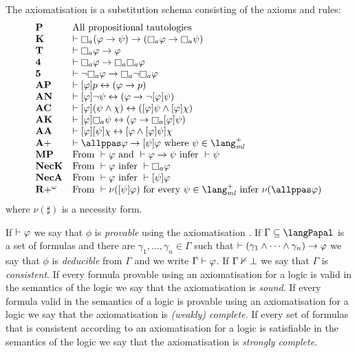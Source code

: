 \begin{definition}
The axiomatisation \axiomPapalS{} is a substitution schema consisting of the axioms and rules:
$$
\begin{array}{ll}
    {\bf P} & \text{All propositional tautologies}\\
    {\bf K} & \proves \knowsA (\phi \implies \psi) \implies (\knowsA \phi \implies \knowsA \psi)\\
    {\bf T} & \proves \knowsA \phi \implies \phi\\
    {\bf 4} & \proves \knowsA \phi \implies \knowsA \knowsA \phi\\
    {\bf 5} & \proves \neg \knowsA \phi \implies \knowsA \neg \knowsA \phi\\
    {\bf AP} & \proves \announceA{\phi} \atomP \iff (\phi \implies \atomP)\\
    {\bf AN} & \proves \announceA{\phi} \neg \psi \iff (\phi \implies \neg \announceA{\phi} \psi)\\
    {\bf AC} & \proves \announceA{\phi} (\psi \land \chi) \iff (\announceA{\phi} \psi \land \announceA{\phi} \chi)\\
    {\bf AK} & \proves \announceA{\phi} \knowsA \psi \iff (\phi \implies \knowsA \announceA{\phi} \psi)\\
    {\bf AA} & \proves \announceA{\phi} \announceA{\psi} \chi \iff \announceA{\phi \land \announceA{\phi} \psi} \chi\\
    {\bf A+} & \proves \allppas \phi \implies \announceA{\psi} \phi \text{ where } \psi \in \langMlPlus\\
    {\bf MP} & \text{From } \proves \phi \text{ and } \proves \phi \implies \psi \text{ infer } \proves \psi\\
    {\bf NecK} & \text{From } \proves \phi \text{ infer } \proves \knowsA \phi\\
    {\bf NecA} & \text{From } \proves \phi \text{ infer } \proves \announceA{\psi} \phi\\
    {\bf R+^\omega} &\text{From } \proves \nu(\announceA{\psi} \phi) \text{ for every } \psi \in \langMlPlus \text{ infer } \nu(\allppas \phi)    \end{array}
$$
where $\nu(\sharp)$ is a necessity form.
\end{definition}

If $\vdash \varphi$ we say that $\phi$ is {\em provable} using the axiomatisation \axiomPapalS{}.
If $\Gamma \subseteq \langPapal$ is a set of formulas and there are $\gamma_1, \dots, \gamma_n \in \Gamma$ such that $\vdash (\gamma_1 \land \cdots \land \gamma_n) \rightarrow \varphi$ we say that $\phi$ is {\em deducible} from $\Gamma$ and we write $\Gamma \vdash \varphi$.
If $\Gamma \nvdash \bot$ we say that $\Gamma$ is {\em consistent}.
If every formula provable using an axiomatisation for a logic is valid in the semantics of the logic we say that the axiomatisation is {\em sound}.
If every formula valid in the semantics of a logic is provable using an axiomatisation for a logic we say that the axiomatisation is {\em (weakly) complete}.
If every set of formulas that is consistent according to an axiomatisation for a logic is satisfiable in the semantics of the logic we say that the axiomatisation is {\em strongly complete}.

